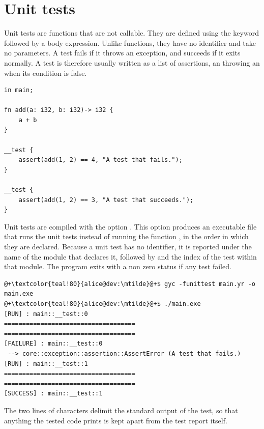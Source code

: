 \section{Unit tests}%
\label{sec:global:unit_test}

Unit tests are functions that are not callable. They are defined using the
keyword  followed by a body expression. Unlike functions, they
have no identifier and take no parameters. A test fails if it throws an
exception, and succeeds if it exits normally. A test is therefore usually
written as a list of assertions, an  throwing an
 when its condition is false.

\begin{lstlisting}[style=coloredverbatim, caption=\textit{main.yr}]
in main;

fn add(a: i32, b: i32)-> i32 {
    a + b
}

__test {
    assert(add(1, 2) == 4, "A test that fails.");
}

__test {
    assert(add(1, 2) == 3, "A test that succeeds.");
}
\end{lstlisting}

Unit tests are compiled with the option . This option produces
an executable file that runs the unit tests instead of running the function
, in the order in which they are declared. Because a unit test has
no identifier, it is reported under the name of the module that declares it,
followed by  and the index of the test within that module. The
program exits with a non zero status if any test failed.

\begin{lstlisting}[style=bashVerb, escapechar=@+]
@+\textcolor{teal!80}{alice@dev:\mtilde}@+$ gyc -funittest main.yr -o main.exe
@+\textcolor{teal!80}{alice@dev:\mtilde}@+$ ./main.exe
[RUN] : main::__test::0
====================================
====================================
[FAILURE] : main::__test::0
 --> core::exception::assertion::AssertError (A test that fails.)
[RUN] : main::__test::1
====================================
====================================
[SUCCESS] : main::__test::1
\end{lstlisting}

The two lines of \token{=} characters delimit the standard output of the test,
so that anything the tested code prints is kept apart from the test report
itself.

\vfill%
\pagebreak
